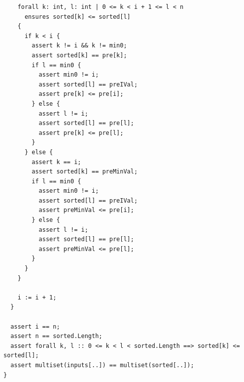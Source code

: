 \documentclass{article}
\begin{document}
\begin{lstlisting}
    forall k: int, l: int | 0 <= k < i + 1 <= l < n
      ensures sorted[k] <= sorted[l]
    {
      if k < i {
        assert k != i && k != min0;
        assert sorted[k] == pre[k];
        if l == min0 {
          assert min0 != i;
          assert sorted[l] == preIVal;
          assert pre[k] <= pre[i];
        } else {
          assert l != i;
          assert sorted[l] == pre[l];
          assert pre[k] <= pre[l];
        }
      } else {
        assert k == i;
        assert sorted[k] == preMinVal;
        if l == min0 {
          assert min0 != i;
          assert sorted[l] == preIVal;
          assert preMinVal <= pre[i];
        } else {
          assert l != i;
          assert sorted[l] == pre[l];
          assert preMinVal <= pre[l];
        }
      }
    }

    i := i + 1;
  }

  assert i == n;
  assert n == sorted.Length;
  assert forall k, l :: 0 <= k < l < sorted.Length ==> sorted[k] <= sorted[l];
  assert multiset(inputs[..]) == multiset(sorted[..]);
}
\end{lstlisting}
\end{document}
